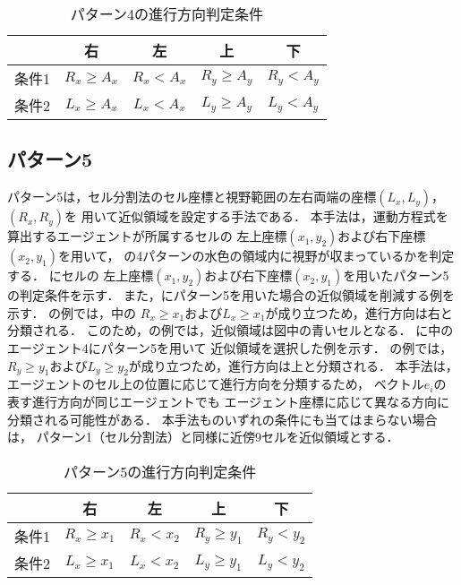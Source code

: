 \begin{table}[t]
	\centering
	\caption{パターン4の進行方向判定条件}
	\label{tb:patan4_joken}
	\begin{tabular}{c|c|c|c|c}
		\hline \hline
		& 右 & 左 & 上 & 下  \\ \hline
		条件1 & $R_x \geq A_x$ & $R_x < A_x$ & $R_y \geq A_y$ & $R_y < A_y $ \\ \hline
	  条件2 & $L_x \geq A_x$ & $L_x < A_x$ & $L_y \geq A_y$ & $L_y < A_y$ \\ \hline
	\end{tabular}
\end{table}




\subsection{パターン5}
パターン5は，セル分割法のセル座標と視野範囲の左右両端の座標$(L_x,L_y)$，$(R_x,R_y)$を
用いて近似領域を設定する手法である．
本手法は，運動方程式を算出するエージェントが所属するセルの
左上座標$(x_1,y_2)$および右下座標$(x_2, y_1)$を用いて，
の4パターンの水色の領域内に視野が収まっているかを判定する．
にセルの
左上座標$(x_1,y_2)$および右下座標$(x_2, y_1)$を用いたパターン5の判定条件を示す．
また，にパターン5を用いた場合の近似領域を削減する例を示す．
の例では，中の
$R_x \geq x_1$および$L_x \geq x_1$が成り立つため，進行方向は右と分類される．
このため，の例では，近似領域は図中の青いセルとなる．
に中のエージェント4にパターン5を用いて
近似領域を選択した例を示す．
の例では，
$R_y \geq y_1$および$L_y \geq y_2$が成り立つため，進行方向は上と分類される．
本手法は，エージェントのセル上の位置に応じて進行方向を分類するため，
ベクトル$e_i$の表す進行方向が同じエージェントでも
エージェント座標に応じて異なる方向に分類される可能性がある．
本手法ものいずれの条件にも当てはまらない場合は，
パターン1（セル分割法）と同様に近傍9セルを近似領域とする．

\begin{table}[t]
	\centering
	\caption{パターン5の進行方向判定条件}
	\label{tb:patan5_joken}
	\begin{tabular}{c|c|c|c|c}
		\hline \hline
		& 右 & 左 & 上 & 下  \\ \hline
 		条件1 & $R_x \geq x_1$ & $R_x < x_2$ & $R_y \geq y_1$ & $R_y < y_2 $ \\ \hline
		条件2 & $L_x \geq x_1$ & $L_x < x_2$ & $L_y \geq y_1$ & $L_y < y_2 $ \\ \hline
	\end{tabular}
\end{table}

